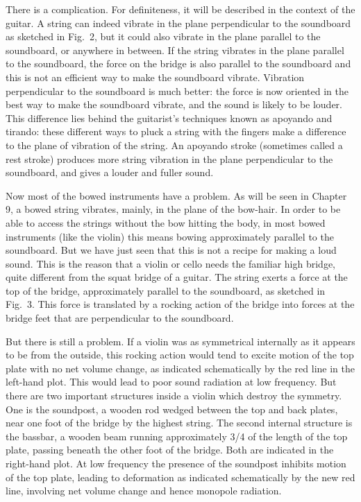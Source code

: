   There is a complication. For definiteness, it will be described in the 
  context of the guitar. A string can indeed vibrate in the plane perpendicular 
  to the soundboard as sketched in Fig.\ 2, but it could also vibrate in the 
  plane parallel to the soundboard, or anywhere in between. If the string 
  vibrates in the plane parallel to the soundboard, the force on the bridge is 
  also parallel to the soundboard and this is not an efficient way to make the 
  soundboard vibrate. Vibration perpendicular to the soundboard is much better: 
  the force is now oriented in the best way to make the soundboard vibrate, and 
  the sound is likely to be louder. This difference lies behind the guitarist's 
  techniques known as apoyando and tirando: these different ways to pluck a 
  string with the fingers make a difference to the plane of vibration of the 
  string. An apoyando stroke (sometimes called a rest stroke) produces more 
  string vibration in the plane perpendicular to the soundboard, and gives a 
  louder and fuller sound. 

  Now most of the bowed instruments have a problem. As will be seen in Chapter 
  9, a bowed string vibrates, mainly, in the plane of the bow-hair. In order to 
  be able to access the strings without the bow hitting the body, in most bowed 
  instruments (like the violin) this means bowing approximately parallel to the 
  soundboard. But we have just seen that this is not a recipe for making a loud 
  sound. This is the reason that a violin or cello needs the familiar high 
  bridge, quite different from the squat bridge of a guitar. The string exerts 
  a force at the top of the bridge, approximately parallel to the soundboard, 
  as sketched in Fig.\ 3. This force is translated by a rocking action of the 
  bridge into forces at the bridge feet that are perpendicular to the 
  soundboard. 

  But there is still a problem. If a violin was as symmetrical internally as it 
  appears to be from the outside, this rocking action would tend to excite 
  motion of the top plate with no net volume change, as indicated schematically 
  by the red line in the left-hand plot. This would lead to poor sound 
  radiation at low frequency. But there are two important structures inside a 
  violin which destroy the symmetry. One is the soundpost, a wooden rod wedged 
  between the top and back plates, near one foot of the bridge by the highest 
  string. The second internal structure is the bassbar, a wooden beam running 
  approximately 3/4 of the length of the top plate, passing beneath the other 
  foot of the bridge. Both are indicated in the right-hand plot. At low 
  frequency the presence of the soundpost inhibits motion of the top plate, 
  leading to deformation as indicated schematically by the new red line, 
  involving net volume change and hence monopole radiation. 

